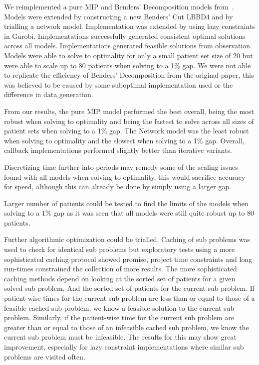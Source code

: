 We reimplemented a pure MIP and Benders' Decomposition models from~\cite{roshanaei2017propagating}. Models were extended by constructing a new Benders' Cut LBBD4 and by trialling a network model. Implementation was extended by using lazy constraints in Gurobi. Implementations successfully generated consistent optimal solutions across all models. Implementations generated feasible solutions from observation. Models were able to solve to optimality for only a small patient set size of 20 but were able to scale up to 80 patients when solving to a 1\% gap. We were not able to replicate the efficiency of Benders' Decomposition from the original paper, this was believed to be caused by some suboptimal implementation used or the difference in data generation.  

From our results, the pure MIP model performed the best overall, being the most robust when solving to optimality and being the fastest to solve across all sizes of patient sets when solving to a 1\% gap. The Network model was the least robust when solving to optimality and the slowest when solving to a 1\% gap. Overall, callback implementations performed slightly better than iterative variants.

Discretizing time further into periods may remedy some of the scaling issues found with all models when solving to optimality, this would sacrifice accuracy for speed, although this can already be done by simply using a larger gap. 

Larger number of patients could be tested to find the limits of the models when solving to a 1\% gap as it was seen that all models were still quite robust up to 80 patients. 

Further algorithmic optimization could be trialled. Caching of sub problems was used to check for identical sub problems but exploratory tests using a more sophisticated caching protocol showed promise, project time constraints and long run-times constrained the collection of more results. The more sophisticated caching methods depend on looking at the sorted set of patients for a given solved sub problem. And the sorted set of patients for the current sub problem. If patient-wise times for the current sub problem are less than or equal to those of a feasible cached sub problem, we know a feasible solution to the current sub problem. Similarly, if the patient-wise time for the current sub problem are greater than or equal to those of an infeasible cached sub problem, we know the current sub problem must be infeasible. The results for this may show great improvement, especially for lazy constraint implementations where similar sub problems are visited often.
